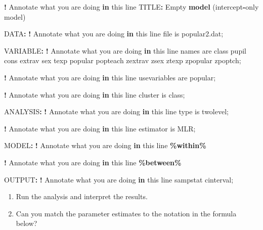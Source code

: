 \documentclass[
]{book}
\newenvironment{Shaded}{\begin{snugshade}}{\end{snugshade}}
\newcommand{\ControlFlowTok}[1]{\textcolor[rgb]{0.13,0.29,0.53}{\textbf{#1}}}
\newcommand{\FunctionTok}[1]{\textcolor[rgb]{0.13,0.29,0.53}{\textbf{#1}}}
\newcommand{\NormalTok}[1]{#1}
\newcommand{\SpecialCharTok}[1]{\textcolor[rgb]{0.81,0.36,0.00}{\textbf{#1}}}
\begin{document}
\begin{Shaded}
\begin{Highlighting}[]
\SpecialCharTok{!}\NormalTok{ Annotate what you are doing }\ControlFlowTok{in}\NormalTok{ this line}
\NormalTok{TITLE}\SpecialCharTok{:}\NormalTok{ Empty }\FunctionTok{model}\NormalTok{ (intercept}\SpecialCharTok{{-}}\NormalTok{only model)}

\NormalTok{DATA}\SpecialCharTok{:}
    \SpecialCharTok{!}\NormalTok{ Annotate what you are doing }\ControlFlowTok{in}\NormalTok{ this line}
\NormalTok{    file is popular2.dat;}

\NormalTok{VARIABLE}\SpecialCharTok{:}
    \SpecialCharTok{!}\NormalTok{ Annotate what you are doing }\ControlFlowTok{in}\NormalTok{ this line}
\NormalTok{    names are class pupil cons extrav sex texp popular popteach zextrav}
\NormalTok{    zsex ztexp zpopular zpoptch;}
    
    \SpecialCharTok{!}\NormalTok{ Annotate what you are doing }\ControlFlowTok{in}\NormalTok{ this line}
\NormalTok{    usevariables are popular;}
    
    \SpecialCharTok{!}\NormalTok{ Annotate what you are doing }\ControlFlowTok{in}\NormalTok{ this line}
\NormalTok{    cluster is class;}

\NormalTok{ANALYSIS}\SpecialCharTok{:}
    \SpecialCharTok{!}\NormalTok{ Annotate what you are doing }\ControlFlowTok{in}\NormalTok{ this line}
\NormalTok{    type is twolevel;}
    
    \SpecialCharTok{!}\NormalTok{ Annotate what you are doing }\ControlFlowTok{in}\NormalTok{ this line}
\NormalTok{    estimator is MLR;}

\NormalTok{MODEL}\SpecialCharTok{:}
    \SpecialCharTok{!}\NormalTok{ Annotate what you are doing }\ControlFlowTok{in}\NormalTok{ this line}
    \SpecialCharTok{\%within\%}

    \SpecialCharTok{!}\NormalTok{ Annotate what you are doing }\ControlFlowTok{in}\NormalTok{ this line}
    \SpecialCharTok{\%between\%}

\NormalTok{OUTPUT}\SpecialCharTok{:}
    \SpecialCharTok{!}\NormalTok{ Annotate what you are doing }\ControlFlowTok{in}\NormalTok{ this line}
\NormalTok{    sampstat cinterval;}
\end{Highlighting}
\end{Shaded}

\begin{enumerate}
\def\labelenumi{\arabic{enumi}.}
\setcounter{enumi}{1}
\item
  Run the analysis and interpret the results.
\item
  Can you match the parameter estimates to the notation in the formula below?
\end{enumerate}
\end{document}
